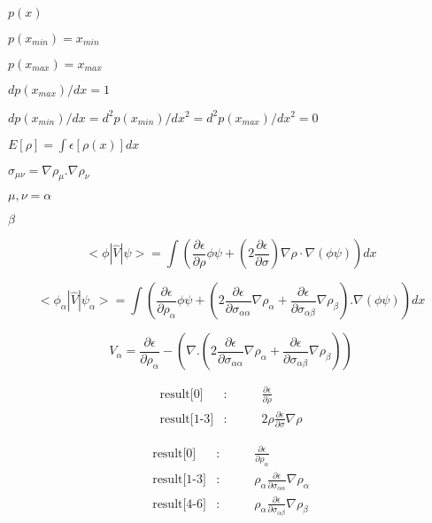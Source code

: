 \documentclass{article}
\begin{document}
$p(x)$
\pagebreak

$p(x_{min})=x_{min}$
\pagebreak

$p(x_{max})=x_{max}$
\pagebreak

$dp(x_{max})/dx=1$
\pagebreak

$dp(x_{min})/dx=d^2p(x_{min})/dx^2=d^2p(x_{max})/dx^2=0$
\pagebreak

$ E[\rho] = \int \epsilon[\rho(x)] dx$
\pagebreak

$ \sigma_{\mu \nu} = \nabla \rho_{\mu} . \nabla \rho_{\nu} $
\pagebreak

$ \mu, \nu = \alpha$
\pagebreak

$ \beta $
\pagebreak

\[ < \phi | \hat V | \psi > = \int \left( \frac{\partial \epsilon}{\partial \rho} \phi \psi + \left( 2 \frac{\partial \epsilon}{\partial \sigma} \right) \nabla \rho \cdot \nabla \left( \phi \psi \right) \right) dx \]
\pagebreak

\[ < \phi_{\alpha} | \hat V | \psi_{\alpha} > = \int \left( \frac{\partial \epsilon}{\partial \rho_{\alpha}} \phi \psi + \left( 2 \frac{\partial \epsilon}{\partial \sigma_{\alpha \alpha}} \nabla \rho_{\alpha} + \frac{\partial \epsilon}{\partial \sigma_{\alpha \beta}} \nabla \rho_{\beta} \right) . \nabla \left( \phi \psi \right) \right) dx \]
\pagebreak

\[ V_{\alpha} = \frac{\partial \epsilon}{\partial \rho_{\alpha}} - \left(\nabla . \left(2 \frac{\partial \epsilon}{\partial \sigma_{\alpha \alpha}} \nabla \rho_{\alpha} + \frac{\partial \epsilon}{\partial \sigma_{\alpha \beta}} \nabla \rho_{\beta} \right) \right) \]
\pagebreak

\begin{eqnarray*} \mbox{result[0]} &:& \qquad \frac{\partial \epsilon}{\partial \rho} \\ \mbox{result[1-3]} &:& \qquad 2 \rho \frac{\partial \epsilon}{\partial \sigma} \nabla\rho \end{eqnarray*}
\pagebreak

\begin{eqnarray*} \mbox{result[0]} &:& \qquad \frac{\partial \epsilon}{\partial \rho_{\alpha}} \\ \mbox{result[1-3]} &:& \qquad \rho_\alpha \frac{\partial \epsilon}{\partial \sigma_{\alpha \alpha}} \nabla\rho_\alpha\\ \mbox{result[4-6]} &:& \qquad \rho_\alpha \frac{\partial \epsilon}{\partial \sigma_{\alpha \beta}} \nabla\rho_\beta \end{eqnarray*}
\pagebreak
\end{document}
